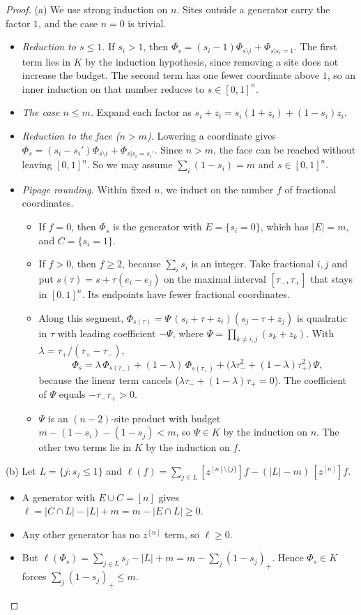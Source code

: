 \documentclass[11pt]{article}
\theoremstyle{remark}
\begin{document}
\begin{proof}
(a) We use strong induction on $n$. Sites outside a generator carry the factor $1$, and the case $n=0$ is trivial.
\begin{itemize}
\item \emph{Reduction to $s\le1$.} If $s_i>1$, then $\Phi_s=(s_i-1)\Phi_{s\setminus i}+\Phi_{s|s_i=1}$. The first
term lies in $K$ by the induction hypothesis, since removing a site does not increase the budget. The second term has
one fewer coordinate above $1$, so an inner induction on that number reduces to $s\in[0,1]^n$.
\item \emph{The case $n\le m$.} Expand each factor as $s_i+z_i=s_i(1+z_i)+(1-s_i)z_i$.
\item \emph{Reduction to the face ($n>m$).} Lowering a coordinate gives
$\Phi_s=(s_i-s_i')\Phi_{s\setminus i}+\Phi_{s|s_i=s_i'}$. Since $n>m$, the face can be reached without leaving
$[0,1]^n$. So we may assume $\sum_i(1-s_i)=m$ and $s\in[0,1]^n$.
\item \emph{Pipage rounding.} Within fixed $n$, we induct on the number $f$ of fractional coordinates.
\begin{itemize}
\item If $f=0$, then $\Phi_s$ is the generator with $E=\{s_i=0\}$, which has $|E|=m$, and $C=\{s_i=1\}$.
\item If $f>0$, then $f\ge2$, because $\sum_is_i$ is an integer. Take fractional $i,j$ and put
$s(\tau)=s+\tau(e_i-e_j)$ on the maximal interval $[\tau_-,\tau_+]$ that stays in $[0,1]^n$. Its endpoints have fewer
fractional coordinates.
\item Along this segment, $\Phi_{s(\tau)}=\Psi\,(s_i+\tau+z_i)(s_j-\tau+z_j)$ is quadratic in $\tau$ with leading
coefficient $-\Psi$, where $\Psi=\prod_{k\ne i,j}(s_k+z_k)$. With $\lambda=\tau_+/(\tau_+-\tau_-)$,
\[
\Phi_s=\lambda\,\Phi_{s(\tau_-)}+(1-\lambda)\,\Phi_{s(\tau_+)}+\big(\lambda\tau_-^2+(1-\lambda)\tau_+^2\big)\,\Psi ,
\]
because the linear term cancels ($\lambda\tau_-+(1-\lambda)\tau_+=0$). The coefficient of $\Psi$ equals
$-\tau_-\tau_+>0$.
\item $\Psi$ is an $(n-2)$-site product with budget $m-(1-s_i)-(1-s_j)<m$, so $\Psi\in K$ by the induction on $n$.
The other two terms lie in $K$ by the induction on $f$.
\end{itemize}
\end{itemize}

(b) Let $L=\{j:s_j\le1\}$ and $\ell(f)=\sum_{j\in L}[z^{[n]\setminus\{j\}}]f-(|L|-m)\,[z^{[n]}]f$.
\begin{itemize}
\item A generator with $E\cup C=[n]$ gives $\ell=|C\cap L|-|L|+m=m-|E\cap L|\ge0$.
\item Any other generator has no $z^{[n]}$ term, so $\ell\ge0$.
\item But $\ell(\Phi_s)=\sum_{j\in L}s_j-|L|+m=m-\sum_j(1-s_j)_+$. Hence $\Phi_s\in K$ forces
$\sum_j(1-s_j)_+\le m$.
\end{itemize}
\end{proof}
\end{document}

